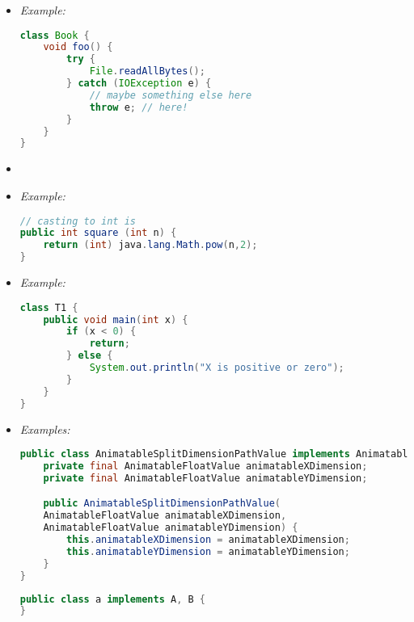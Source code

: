 \begin{itemize}
	\item {}
	{\it Example:}
\begin{lstlisting}[language=Java]
class Book {
	void foo() {
		try {
			File.readAllBytes();
		} catch (IOException e) {
			// maybe something else here
			throw e; // here!
		}
	}
}
\end{lstlisting}

	\item {}

	\item {}
	{\it Example:}
\begin{lstlisting}[language=Java]
// casting to int is
public int square (int n) {
	return (int) java.lang.Math.pow(n,2);
}
\end{lstlisting}

	\item {}
	{\it Example:}
	\begin{lstlisting}[language=Java]
class T1 {
	public void main(int x) {
		if (x < 0) {
			return;
		} else {
			System.out.println("X is positive or zero");
		}
	}
}
\end{lstlisting}

	\item {}
	{\it Examples:}
	\begin{lstlisting}[language=Java]
public class AnimatableSplitDimensionPathValue implements AnimatableValue<PointF, PointF> {
	private final AnimatableFloatValue animatableXDimension;
	private final AnimatableFloatValue animatableYDimension;

	public AnimatableSplitDimensionPathValue(
	AnimatableFloatValue animatableXDimension,
	AnimatableFloatValue animatableYDimension) {
		this.animatableXDimension = animatableXDimension;
		this.animatableYDimension = animatableYDimension;
	}
}
\end{lstlisting}
\begin{lstlisting}[language=Java]
public class a implements A, B {
}
\end{lstlisting}


\end{itemize}
